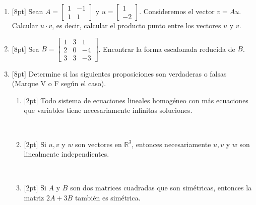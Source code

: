 \documentclass[11pt]{article}
\newcommand{\vf}{\fbox{V}\ \fbox{F}}
\begin{document}
\begin{enumerate}
\item{}[8pt] Sean $A = \begin{bmatrix}1 & -1\\ 1 & 1\end{bmatrix}$ y $u = \begin{bmatrix}1\\-2\end{bmatrix}$. Consideremos el vector $v = Au$. Calcular $u\cdot v$, es decir, calcular el producto punto entre los vectores $u$ y $v$.

\vspace{4pt}

\item{}[8pt] Sea $B = \begin{bmatrix}1 & 3 & 1\\ 2 & 0 & -4\\ 3 & 3 & -3\end{bmatrix}$. Encontrar la forma escalonada reducida de $B$.

\vspace{4pt}

\item{}[8pt] Determine si las siguientes proposiciones son verdaderas o falsas (Marque V o F según el caso).
\begin{enumerate}
\item{}[2pt] Todo sistema de ecuaciones lineales homogéneo con más ecuaciones que variables tiene necesariamente infinitas soluciones.

\vf

\item{}[2pt] Si $u, v$ y $w$ son vectores en $\mathbb{R}^3$, entonces necesariamente $u, v$ y $w$ son linealmente independientes.

\vf

\item{}[2pt] Si $A$ y $B$ son dos matrices cuadradas que son simétricas, entonces la matriz $2A+3B$ también es simétrica.


\end{enumerate}
\end{enumerate}
\end{document}
